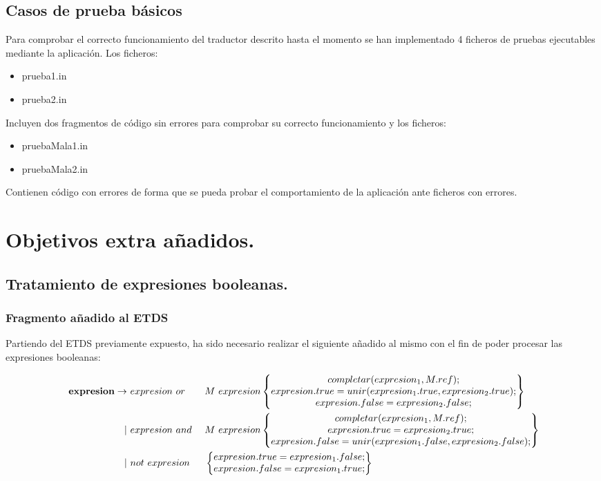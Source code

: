 \documentclass[12pt,a4paper,landscape]{article}
\theoremstyle{mytheor}
\begin{document}
\subsection{Casos de prueba básicos}
Para comprobar el correcto funcionamiento del traductor descrito hasta el momento se han implementado 4 ficheros de pruebas ejecutables mediante la aplicación. Los ficheros:
\begin{itemize}
\item prueba1.in
\item prueba2.in
\end{itemize}
Incluyen dos fragmentos de código sin errores para comprobar su correcto funcionamiento y los ficheros:
\begin{itemize}
\item pruebaMala1.in
\item pruebaMala2.in
\end{itemize}
Contienen código con errores de forma que se pueda probar el comportamiento de la aplicación ante ficheros con errores.


\section{Objetivos extra añadidos.}
\subsection{Tratamiento de expresiones booleanas.}
\subsubsection{Fragmento añadido al ETDS}
Partiendo del ETDS previamente expuesto, ha sido necesario realizar el siguiente añadido al mismo con el fin de poder procesar las expresiones booleanas:
\begin{center}
     \begin{alignat*}{2}
     \text{  \textbf{expresion}} \to\ &  expresion\ or && M\ expresion \begin{Bmatrix} completar(expresion_1, M.ref);\\ expresion.true=unir(expresion_1.true, expresion_2.true); \\  expresion.false=expresion_2.false;\end{Bmatrix} \\
      |\ & expresion\ and\ && M\ expresion  \begin{Bmatrix} completar(expresion_1, M.ref);\\ expresion.true=expresion_2.true; \\  expresion.false=unir(expresion_1.false, expresion_2.false);\end{Bmatrix}\\
      |\ & not\ expresion && \begin{Bmatrix} expresion.true=expresion_1.false; \\  expresion.false=expresion_1.true;\end{Bmatrix}
      \end{alignat*}
\end{center}
\end{document}
